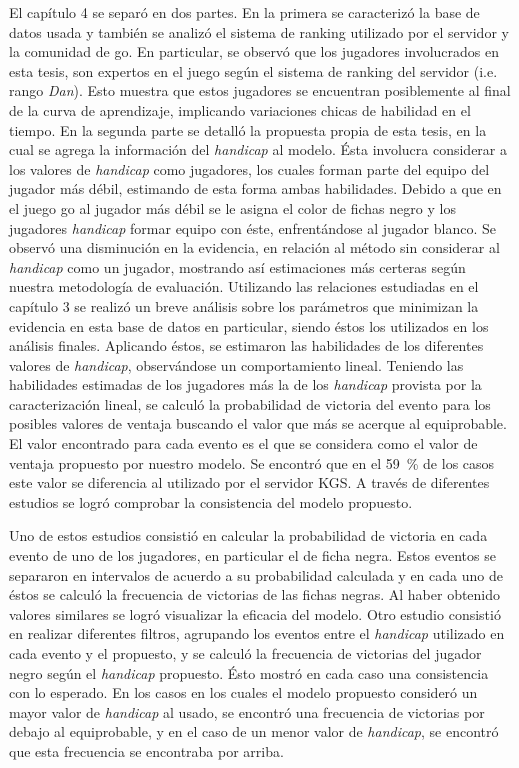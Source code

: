 \documentclass[11pt,twoside,spanish]{report} %
\begin{document}
El cap\'itulo 4 se separ\'o en dos partes.
En la primera se caracteriz\'o la base de datos usada y tambi\'en se analiz\'o el sistema de ranking utilizado por el servidor y la comunidad de go.
En particular, se observ\'o que los jugadores involucrados en esta tesis, son expertos en el juego seg\'un el sistema de ranking del servidor (i.e. rango \textit{Dan}).
Esto muestra que estos jugadores se encuentran posiblemente al final de la curva de aprendizaje, implicando variaciones chicas de habilidad en el tiempo.
En la segunda parte se detall\'o la propuesta propia de esta tesis, en la cual se agrega la informaci\'on del \textit{handicap} al modelo.
\'Esta involucra considerar a los valores de \textit{handicap} como jugadores, los cuales forman parte del equipo del jugador m\'as d\'ebil, estimando de esta forma ambas habilidades.
Debido a que en el juego go al jugador m\'as d\'ebil se le asigna el color de fichas negro y los jugadores  \textit{handicap} formar equipo con \'este, enfrent\'andose al jugador blanco.
Se observ\'o una disminuci\'on en la evidencia, en relaci\'on al m\'etodo sin considerar al \textit{handicap} como un jugador, mostrando as\'i estimaciones m\'as certeras seg\'un nuestra metodolog\'ia de evaluaci\'on.
Utilizando las relaciones estudiadas en el cap\'itulo 3 se realiz\'o un breve an\'alisis sobre los par\'ametros que minimizan la evidencia en esta base de datos en particular, siendo \'estos los utilizados en los an\'alisis finales.
Aplicando \'estos, se estimaron las habilidades de los diferentes valores de \textit{handicap}, observ\'andose un comportamiento lineal.
Teniendo las habilidades estimadas de los jugadores m\'as la de los \textit{handicap} provista por la caracterizaci\'on lineal, se calcul\'o la probabilidad de victoria del evento para los posibles valores de ventaja buscando el valor que m\'as se acerque al equiprobable.
El valor encontrado para cada evento es el que se considera como el valor de ventaja propuesto por nuestro modelo.
Se encontr\'o que en el \SI{59}{\percent} de los casos este valor se diferencia al utilizado por el servidor KGS.
A trav\'es de diferentes estudios se logr\'o comprobar la consistencia del modelo propuesto.

Uno de estos estudios consisti\'o en calcular la probabilidad de victoria en cada evento de uno de los jugadores, en particular el de ficha negra.
Estos eventos se separaron en intervalos de acuerdo a su probabilidad calculada y en cada uno de \'estos se calcul\'o la frecuencia de victorias de las fichas negras.
Al haber obtenido valores similares se logr\'o visualizar la eficacia del modelo.
Otro estudio consisti\'o en realizar diferentes filtros, agrupando los eventos entre el \textit{handicap} utilizado en cada evento y el propuesto, y se calcul\'o la frecuencia de victorias del jugador negro seg\'un el \textit{handicap} propuesto.
\'Esto mostr\'o en cada caso una consistencia con lo esperado.
En los casos en los cuales el modelo propuesto consider\'o un mayor valor de \textit{handicap} al usado, se encontr\'o una frecuencia de victorias por debajo al equiprobable, y en el caso de un menor valor de \textit{handicap}, se encontr\'o que esta frecuencia se encontraba por arriba.
\end{document}

